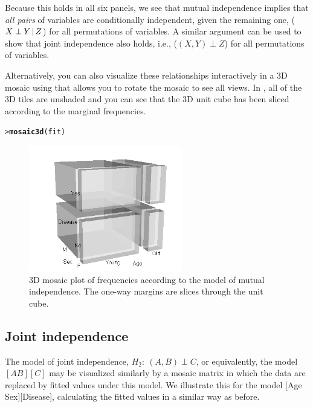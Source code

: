 \documentclass[10pt,krantz2]{krantz}\usepackage[]{graphicx}\usepackage[]{color}
\makeatletter
\newcommand{\hlstd}[1]{\textcolor[rgb]{0.345,0.345,0.345}{#1}}%
\newcommand{\hlkwd}[1]{\textcolor[rgb]{0.737,0.353,0.396}{\textbf{#1}}}%
\newenvironment{kframe}{%
 \def\at@end@of@kframe{}%
 \ifinner\ifhmode%
  \def\at@end@of@kframe{\end{minipage}}%
  \begin{minipage}{\columnwidth}%
 \fi\fi%
 \def\FrameCommand##1{\hskip\@totalleftmargin \hskip-\fboxsep
 \colorbox{shadecolor}{##1}\hskip-\fboxsep
     \hskip-\linewidth \hskip-\@totalleftmargin \hskip\columnwidth}%
 \MakeFramed {\advance\hsize-\width
   \@totalleftmargin\z@ \linewidth\hsize
   \@setminipage}}%
 {\par\unskip\endMakeFramed%
 \at@end@of@kframe}
\newenvironment{knitrout}{}{} %
\renewenvironment{knitrout}{\small\renewcommand{\baselinestretch}{.85}}{} %
\makeatother
\begin{document}
Because this holds in all six panels, we see that mutual independence
implies that \emph{all pairs} of variables are conditionally
independent, given the remaining one,  ($X \perp Y \, | \, Z$) for all
permutations of variables.  A similar argument can be used to
show that joint independence also holds, i.e., ($(X,Y) \perp Z$) for all
permutations of variables.

Alternatively, you can also visualize these relationships interactively
in a 3D mosaic using 
that allows you to rotate the mosaic to see all views.  In ,
all of the 3D tiles are unshaded and you can see that the 3D unit cube has been
sliced according to the marginal frequencies.

\begin{knitrout}
\color{fgcolor}\begin{kframe}
\begin{alltt}
\hlstd{> }\hlkwd{mosaic3d}\hlstd{(fit)}
\end{alltt}
\end{kframe}
\end{knitrout}

\begin{figure}[!htb]
 \centering
 \includegraphics[width=0.6\textwidth]{ch05/fig/struct-mos3d1.png}
 \caption{3D mosaic plot of frequencies according to the model of mutual independence. The one-way margins are
 slices through the unit cube.}\label{fig:struct-mos3d1}
\end{figure}


\subsection{Joint independence}
The model of joint independence, $H_2: \: (A, B) \perp C$, or
equivalently, the \loglin model $[A B][C]$
may be visualized similarly
by a mosaic matrix
in which the data are replaced by fitted values under this model.
We illustrate this for the model [Age Sex][Disease],
calculating the fitted values in a similar way as before.
\end{document}
